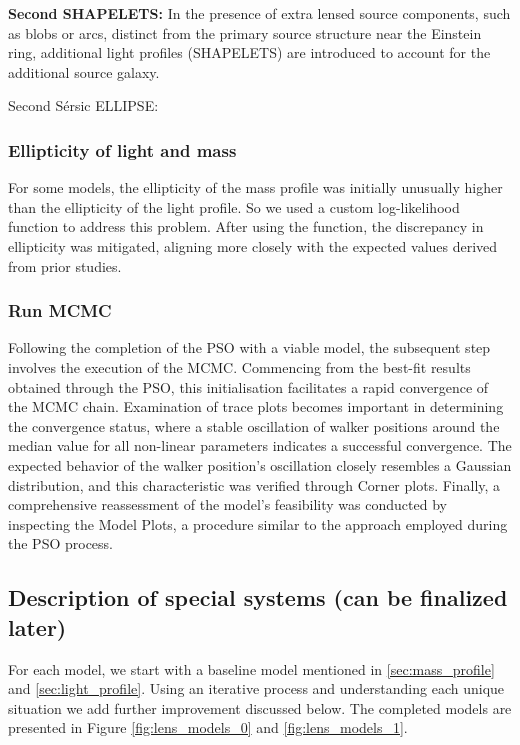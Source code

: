 \documentclass{aa}
\begin{document}
\textbf{Second SHAPELETS:} In the presence of extra lensed source components, such as blobs or arcs, distinct from the primary source structure near the Einstein ring, additional light profiles (SHAPELETS) are introduced to account for the additional source galaxy. 

Second S\'ersic ELLIPSE:

\subsubsection{Ellipticity of light and mass}
For some models, the ellipticity of the mass profile was initially unusually higher than the ellipticity of the light profile. So we used a custom log-likelihood function to address this problem. After using the function, the discrepancy in ellipticity was mitigated, aligning more closely with the expected values derived from prior studies.

\subsubsection{Run MCMC}
Following the completion of the PSO with a viable model, the subsequent step involves the execution of the MCMC. Commencing from the best-fit results obtained through the PSO, this initialisation facilitates a rapid convergence of the MCMC chain. Examination of trace plots becomes important in determining the convergence status, where a stable oscillation of walker positions around the median value for all non-linear parameters indicates a successful convergence. The expected behavior of the walker position's oscillation closely resembles a Gaussian distribution, and this characteristic was verified through Corner plots. Finally, a comprehensive reassessment of the model's feasibility was conducted by inspecting the Model Plots, a procedure similar to the approach employed during the PSO process.

\subsection{Description of special systems (can be finalized later)}

For each model, we start with a baseline model mentioned in \ref{sec:mass_profile} and \ref{sec:light_profile}. Using an iterative process and understanding each unique situation we add further improvement discussed below. The completed models are presented in Figure \ref{fig:lens_models_0} and \ref{fig:lens_models_1}.
\end{document}
